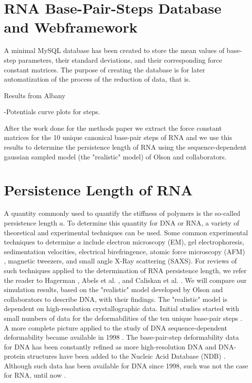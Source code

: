 \section{RNA Base-Pair-Steps Database and Webframework}
A minimal MySQL database has been  created to store the mean values of
base-step   parameters,   their   standard   deviations,   and   their
corresponding  force constant  matrices. The  purpose of  creating the
database is for  later automatization of the process  of the reduction
of data, that is.


Results from Albany

-Potentials curve plots for steps.



After the work done for the methods paper we extract the force
constant matrices for the 10 unique canonical base-pair steps of RNA
and we use this results to determine the persistence length of RNA
using the sequence-dependent gaussian sampled model (the "realistic"
model) of Olson and collaborators.




\section{Persistence Length of RNA}
A quantity commonly used to  quantify the stiffness of polymers is the
so-called persistence  length $a$. To determine this  quantity for DNA
or RNA,  a variety of  theoretical and experimental techniques  can be
used.  Some  common experimental  techniques to determine  $a$ include
electron   microscopy   (EM),   gel   electrophoresis,   sedimentation
velocities, electrical birefringence,  atomic force microscopy (AFM) ,
magnetic  tweezers,  and small  angle  X-Ray  scattering (SAXS).   For
reviews  of  such  techniques  applied  to the  determination  of  RNA
persistence    length,    we   refer    the    reader   to    Hagerman
\cite{hagerman1997}, Abels  et al.  \cite{abels2005},  and Caliskan et
al.   \cite{caliskan2005}.  We  will compare  our  simulation results,
based on  the "realistic" model  developed by Olson  and collaborators
\cite{olson1995} to describe DNA, with their findings. The "realistic"
model is dependent  on high-resolution crystallographic data.  Initial
studies started with small numbers  of data for the deformabilities of
the  ten unique  base-pair  steps \cite{olson1995}.   A more  complete
picture applied  to the study of DNA  sequence-dependent deformability
became  available   in  1998  \cite{olson1998}.    The  base-pair-step
deformability  data  for  DNA  has  been constantly  refined  as  more
high-resolution DNA and DNA-protein  structures have been added to the
Nucleic Acid Database (NDB) \cite{balasubramanian2009}.  Although such
data has been available for DNA  since 1998, such was not the case for
RNA, until now \cite{olson2009}.

